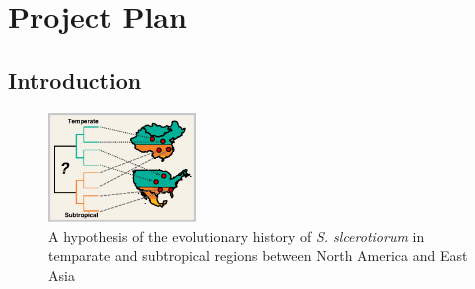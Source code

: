 \documentclass[12pt,letterpaper]{article}
\begin{document}
\section{Project Plan}


\subsection{Introduction}





\begin{figure} %
  \includegraphics[width=0.35\textwidth]{figure/us-china.pdf}
  \caption{A hypothesis of the evolutionary history of \textit{S. slcerotiorum} in temparate and subtropical regions between North America and East Asia}
  \label{fig:us-china}
\end{figure}
\end{document}
